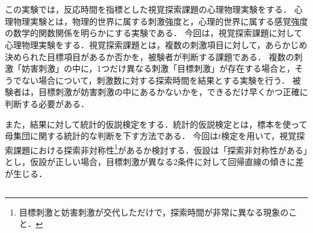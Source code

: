 \chapter{\kadaib}
\section{\purpose}
この実験では，反応時間を指標とした視覚探索課題の心理物理実験をする．
心理物理実験とは，物理的世界に属する刺激強度と，心理的世界に属する感覚強度の数学的関数関係を明らかにする実験である\cite{心理物理測定法}．
今回は，視覚探索課題に対して心理物理実験をする．視覚探索課題とは，複数の刺激項目に対して，あらかじめ決められた目標項目があるか否かを，被験者が判断する課題である\cite{視覚探索}．
複数の刺激「妨害刺激」の中に，1つだけ異なる刺激「目標刺激」が存在する場合と，そうでない場合について，刺激数に対する探索時間を結果とする実験を行う．
被験者は，目標刺激が妨害刺激の中にあるかないかを，できるだけ早くかつ正確に判断する必要がある．\par
また，結果に対して統計的仮説検定をする．統計的仮説検定とは，標本を使って母集団に関する統計的な判断を下す方法である\cite[p.200]{Pythonで学ぶあたらしい統計学の教科書}．
今回は\(t\)検定を用いて，視覚探索課題における探索非対称性\footnote{目標刺激と妨害刺激が交代しただけで，探索時間が非常に異なる現象のこと\cite{4視覚探索}．}があるか検討する．仮設は「探索非対称性がある」とし，仮設が正しい場合，目標刺激が異なる2条件に対して回帰直線の傾きに差が生じる．
\section{\method}
